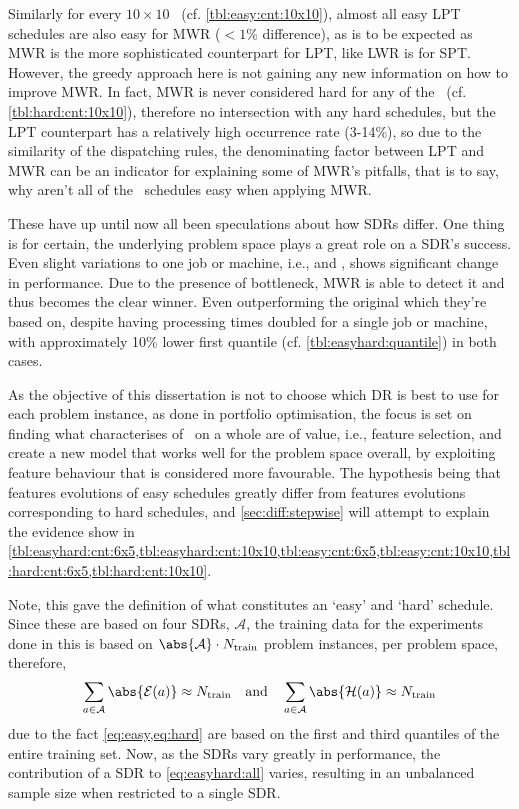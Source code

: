 Similarly for every $10\times10$ \JSP\ (cf. \cref{tbl:easy:cnt:10x10}), almost all easy LPT schedules are also easy  for MWR ($<1\%$ difference), as is to be expected as MWR is the more sophisticated counterpart for LPT, like LWR is for SPT. However, the greedy approach here is  not gaining any new information on how to improve MWR. In fact, MWR is never considered hard for any of the \JSP\ (cf. \cref{tbl:hard:cnt:10x10}), therefore no intersection with any hard schedules, but the LPT counterpart has a relatively high occurrence rate (3-14\%), so due to the similarity of the dispatching rules, the denominating factor between LPT and MWR can be an indicator for explaining some of MWR's pitfalls, that is to say, why aren't all of the \jsp\ schedules easy when applying MWR. 

These have up until now all been speculations about how SDRs differ. One thing is for certain, the underlying problem space plays a great role on a SDR's success. Even slight variations to one job or machine, i.e.,  and , shows significant change in performance. Due to the presence of bottleneck, MWR is able to detect it and thus becomes the clear winner. Even outperforming the original  which they're based on, despite having processing times doubled for a single job or machine, with approximately 10\% lower first quantile (cf. \cref{tbl:easyhard:quantile}) in both cases. 

As the objective of this dissertation is not to choose which DR is best to use for each problem instance, as done in portfolio optimisation, the focus is set on finding what characterises of \jsp\ on a whole are of value, i.e., feature selection, and create a new model that works well for the problem space overall, by exploiting feature behaviour that is considered more favourable. The hypothesis being that features evolutions of easy schedules greatly differ from features evolutions corresponding to hard schedules, and \cref{sec:diff:stepwise} will attempt to explain the evidence show in \cref{tbl:easyhard:cnt:6x5,tbl:easyhard:cnt:10x10,tbl:easy:cnt:6x5,tbl:easy:cnt:10x10,tbl:hard:cnt:6x5,tbl:hard:cnt:10x10}.

Note, this  gave the definition of what constitutes an `easy' and `hard' schedule. Since these are based on four SDRs, $\mathcal{A}$, the training data for the experiments done in this  is based on $\abs{\mathcal{A}}\cdot N_{\text{train}}$ problem instances, per problem space, therefore,
\begin{equation}\label{eq:easyhard:all}
\sum_{a\in\mathcal{A}}\abs{\mathcal{E}(a)} \approx N_{\text{train}}
\quad\text{and}\quad
\sum_{a\in\mathcal{A}}\abs{\mathcal{H}(a)} \approx N_{\text{train}}
\end{equation} 
due to the fact \cref{eq:easy,eq:hard} are based on the first and third quantiles of the entire training set.
Now, as the SDRs vary greatly in performance, the contribution of a SDR to \cref{eq:easyhard:all} varies, resulting in an unbalanced sample size when restricted to a single SDR. 

